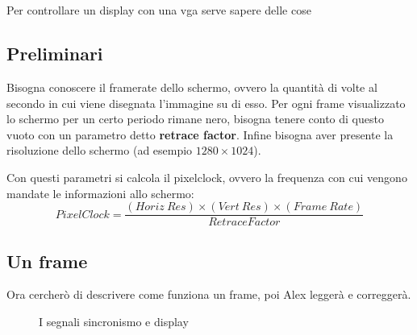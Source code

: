 \section{}
Per controllare un display con una vga serve sapere delle cose

\subsection{Preliminari}
Bisogna conoscere il framerate dello schermo, ovvero la quantit\`a di volte al secondo in cui viene disegnata l'immagine su di esso. Per ogni frame visualizzato lo schermo per un certo periodo rimane nero, bisogna tenere conto di questo vuoto con un parametro detto \textbf{retrace factor}. Infine bisogna aver presente la risoluzione dello schermo (ad esempio $1280\times1024$).

Con questi parametri si calcola il pixelclock, ovvero la frequenza con cui vengono mandate le informazioni allo schermo:
\begin{equation}\label{eq:pixelclock}
PixelClock = \frac{(Horiz\ Res) \times (Vert\ Res) \times (Frame\ Rate)}
{Retrace Factor}
\end{equation}

\subsection{Un frame}
Ora cercher\`o di descrivere come funziona un frame, poi Alex legger\`a e corregger\`a.

\begin{figure}[hbt]
	\centering
{}
\caption{I segnali sincronismo e display}
\end{figure}

